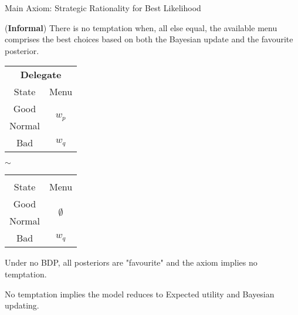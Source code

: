 \documentclass[usenames,dvipsnames,aspectratio=169,11pt, envcountsect, handout]{beamer}
\begin{document}
\begin{frame}[noframenumbering]{Main Axiom: Strategic Rationality for Best Likelihood}

	\begin{axiom}
		(\textbf{Informal}) There is no temptation when, all else equal, the available menu comprises the best choices based on both the Bayesian update and the favourite posterior. \: \: \hyperlink{srblapp}{}
	\end{axiom}

	\vfill

	\begin{table}[H]
		\centering
		\begin{minipage}{0.4\textwidth}
			\centering
			\begin{tabular}{c | c}
				\multicolumn{2}{c}{\textbf{Delegate}}                           \\
				State                & Menu                                     \\
				\hline
				{\color{blue}Good}   & \multirow{2}{*}{{\color{blue}\( w_p \)}} \\
				{\color{blue}Normal} &                                          \\
				Bad                  & \( w_q \)                                \\
			\end{tabular}
			\vspace{0.5cm} %
		\end{minipage}%
		\( \sim \)
		\begin{minipage}{0.4\textwidth}
			\centering
			\begin{tabular}{c | c}
				\multicolumn{2}{c}{}                                                \\
				State                & Menu                                         \\
				\hline
				{\color{blue}Good}   & \multirow{2}{*}{{\color{blue}\(\emptyset\)}} \\
				{\color{blue}Normal} &                                              \\
				Bad                  & \( w_q \)                                    \\
			\end{tabular}
			\vspace{0.5cm} %
		\end{minipage} %
	\end{table} \pause

	\vfill

	Under no BDP, all posteriors are "favourite" and the axiom implies no temptation.

	\vfill

	No temptation implies the model reduces to Expected utility and Bayesian updating.
\end{frame}
\end{document}
